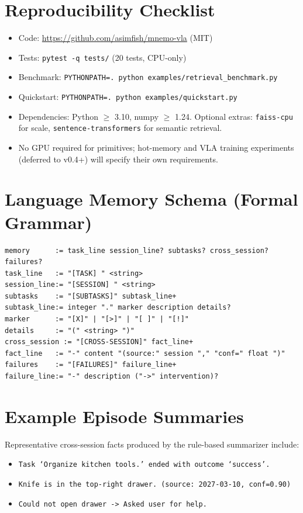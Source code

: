\section{Reproducibility Checklist}
\label{app:repro}

\begin{itemize}
\item Code: \url{https://github.com/asimfish/mnemo-vla} (MIT)
\item Tests: \texttt{pytest -q tests/} (20 tests, CPU-only)
\item Benchmark: \texttt{PYTHONPATH=. python examples/retrieval\_benchmark.py}
\item Quickstart: \texttt{PYTHONPATH=. python examples/quickstart.py}
\item Dependencies: Python $\geq$ 3.10, numpy $\geq$ 1.24.
      Optional extras: \texttt{faiss-cpu} for scale,
      \texttt{sentence-transformers} for semantic retrieval.
\item No GPU required for primitives; hot-memory and VLA training
      experiments (deferred to v0.4+) will specify their own
      requirements.
\end{itemize}

\section{Language Memory Schema (Formal Grammar)}
\label{app:grammar}

\begin{verbatim}
memory      := task_line session_line? subtasks? cross_session? failures?
task_line   := "[TASK] " <string>
session_line:= "[SESSION] " <string>
subtasks    := "[SUBTASKS]" subtask_line+
subtask_line:= integer "." marker description details?
marker      := "[X]" | "[>]" | "[ ]" | "[!]"
details     := "(" <string> ")"
cross_session := "[CROSS-SESSION]" fact_line+
fact_line   := "-" content "(source:" session "," "conf=" float ")"
failures    := "[FAILURES]" failure_line+
failure_line:= "-" description ("->" intervention)?
\end{verbatim}

\section{Example Episode Summaries}
\label{app:examples}

Representative cross-session facts produced by the rule-based
summarizer include:

\begin{itemize}
\item \texttt{Task `Organize kitchen tools.' ended with outcome
      `success'.}
\item \texttt{Knife is in the top-right drawer. (source:
      2027-03-10, conf=0.90)}
\item \texttt{Could not open drawer -> Asked user for help.}
\end{itemize}
